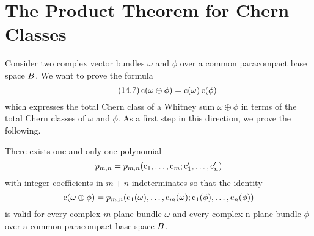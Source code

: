 \documentclass[../main]{subfiles}
\begin{document}
\section{The Product Theorem for Chern Classes}
Consider two complex vector bundles $\omega$ and $\phi$ over a common paracompact base space $B$. We want to prove the formula
\[\tag{14.7}\label{eqn:14.07}
\operatorname{c}(\omega \oplus \phi)=\operatorname{c}(\omega) \operatorname{c}(\phi)
\]
which expresses the total Chern class of a Whitney sum $\omega \oplus \phi$ in terms of the total Chern classes of $\omega$ and $\phi$. As a first step in this direction, we prove the following.

\setcounter{theorem}{7}
\begin{lemma}\label{lem:14.08}
 There exists one and only one polynomial
\[
p_{m, n}=p_{m, n}(\operatorname{c}_{1}, \ldots, \operatorname{c}_{m} ; \operatorname{c}_{1}^{\prime}, \ldots, \operatorname{c}_{n}^{\prime})
\]
with integer coefficients in $m+n$ indeterminates so that the identity
\[
\operatorname{c}(\omega \oplus \phi)=p_{m, n}(\operatorname{c}_{1}(\omega), \ldots, \operatorname{c}_{m}(\omega) ; \operatorname{c}_{1}(\phi), \ldots, \operatorname{c}_{n}(\phi))
\]
is valid for every complex $m$-plane bundle $\omega$ and every complex n-plane bundle $\phi$ over a common paracompact base space $B$.
\end{lemma}
\end{document}
